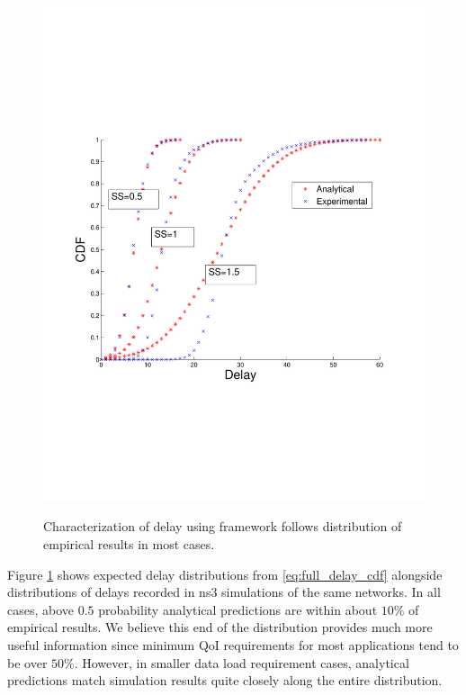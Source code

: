 \begin{figure}[]
{        \includegraphics[scale=0.40, clip=true, trim=12mm 65mm 20mm 65mm]{figures/delay_cdfs/delay_cdf_grid.pdf}
        \label{fig:scal_vs_qoi_grid}
        }
   \caption{Characterization of delay using framework follows distribution of empirical results in most cases.}
   \label{fig:delay_cdf_anal_vs_sim}
\end{figure}

Figure \ref{fig:delay_cdf_anal_vs_sim} shows expected delay distributions from \ref{eq:full_delay_cdf} alongside distributions of delays recorded in ns3 simulations of the same networks.  In all cases, above $0.5$ probability analytical predictions are within about $10\%$ of empirical results.  We believe this end of the distribution provides much more useful information since minimum QoI requirements for most applications tend to be over $50\%$.  However, in smaller data load requirement cases, analytical predictions match simulation results quite closely along the entire distribution.

%

